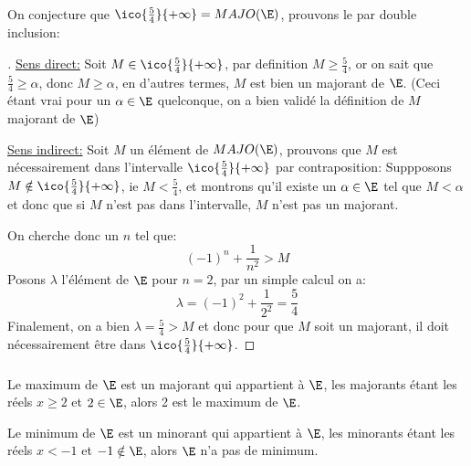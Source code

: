 \subsubsection*{}

On conjecture que \(\ico{\frac{5}{4}}{+\infty} = MAJO(\E) \), prouvons le par double inclusion:

\begin{proof}[\unskip\nopunct]
   \underline{Sens direct:}\+
   Soit \(M \in \ico{\frac{5}{4}}{+\infty}\), par definition \(M \geq \frac{5}{4}\), or on sait que \(\frac{5}{4} \geq \alpha\), donc \(M \geq \alpha\), en d'autres termes, \(M\) est bien un majorant de \(\E\). (Ceci étant vrai pour un \(\alpha \in \E\) quelconque, on a bien validé la définition de \(M\) majorant de $\E$)\<
   
   \underline{Sens indirect:}\+
   Soit $M$ un élément de $MAJO(\E)$, prouvons que $M$ est nécessairement dans l'intervalle $\ico{\frac{5}{4}}{+\infty}$ par contraposition:\<
   Suppposons $M \notin \ico{\frac{5}{4}}{+\infty}$, ie $M < \frac{5}{4}$, et montrons qu'il existe un $\alpha \in \E$ tel que $M < \alpha$ et donc que si \(M\) n'est pas dans l'intervalle, \(M\) n'est pas un majorant.\<

   On cherche donc un \(n\) tel que:
   \[
      {(-1)}^n + \frac{1}{n^2} > M
   \]
   Posons \(\lambda\) l'élément de \(\E\) pour \(n = 2\), par un simple calcul on a:
   \[
      \lambda = {(-1)}^2 + \frac{1}{2^2} = \frac{5}{4}
   \]
   Finalement, on a bien \(\lambda = \frac{5}{4} > M\) et donc pour que \(M\) soit un majorant, il doit nécessairement être dans $\ico{\frac{5}{4}}{+\infty}$.

\end{proof}

\subsubsection*{}

Le maximum de $\E$ est un majorant qui appartient à $\E$, les majorants étant les réels $x \geq 2$ et $2 \in \E$, alors 2 est le maximum de $\E$.

Le minimum de $\E$ est un minorant qui appartient à $\E$, les minorants étant les réels $x < -1$ et $-1 \notin \E$, alors $\E$ n'a pas de minimum.

\subsubsection*{}

